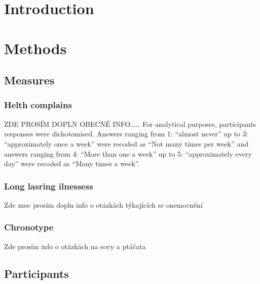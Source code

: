 \documentclass[ijerph,article,accept,moreauthors,pdftex]{mdpi}
\begin{document}

\hypertarget{introduction}{%
\section{Introduction}\label{introduction}}

\hypertarget{methods}{%
\section{Methods}\label{methods}}

\hypertarget{measures}{%
\subsection{Measures}\label{measures}}

\hypertarget{helth-complains}{%
\subsubsection{Helth complains}\label{helth-complains}}

ZDE PROSÍM DOPLN OBECNÉ INFO\ldots\ldots{} For analytical purposes,
participants responses were dichotomised. Answers ranging from 1:
``almost never'' up to 3: ``approximately once a week'' were recoded as
``Not many times per week'' and answers ranging from 4: ``More than one
a week'' up to 5: ``approximately every day'' were recoded as ``Many
times a week''.

\hypertarget{long-lasring-ilnessess}{%
\subsubsection{Long lasring ilnessess}\label{long-lasring-ilnessess}}

Zde moc prosím dopln info o otázkách týkajících se onemocnění

\hypertarget{chronotype}{%
\subsubsection{Chronotype}\label{chronotype}}

Zde prosím info o otázkách na sovy a ptáčata

\hypertarget{participants}{%
\subsection{Participants}\label{participants}}
\end{document}
